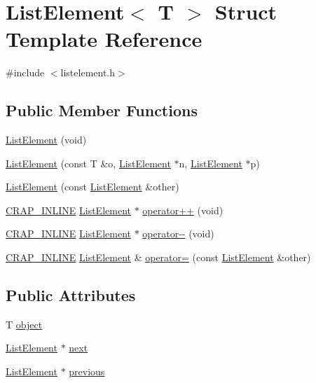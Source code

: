 \hypertarget{struct_list_element}{\section{List\-Element$<$ T $>$ Struct Template Reference}
\label{struct_list_element}
}


{\ttfamily \#include $<$listelement.\-h$>$}

\subsection*{Public Member Functions}
\begin{DoxyCompactItemize}
\item 
\hyperlink{struct_list_element_a61f2c7a2b234ef0737e10493a07c3ca5}{List\-Element} (void)
\item 
\hyperlink{struct_list_element_a82bf6e4fa03b8b37924aa5b9a079272e}{List\-Element} (const T \&o, \hyperlink{struct_list_element}{List\-Element} $\ast$n, \hyperlink{struct_list_element}{List\-Element} $\ast$p)
\item 
\hyperlink{struct_list_element_a2bdd4f435dffcc1f178ea8fd02c91c47}{List\-Element} (const \hyperlink{struct_list_element}{List\-Element} \&other)
\item 
\hyperlink{compilers_8h_a5a40526b8d842e7ff731509998bb0f1c}{C\-R\-A\-P\-\_\-\-I\-N\-L\-I\-N\-E} \hyperlink{struct_list_element}{List\-Element} $\ast$ \hyperlink{struct_list_element_a1afd786d60c33e4b9d4dc960a64a70bc}{operator++} (void)
\item 
\hyperlink{compilers_8h_a5a40526b8d842e7ff731509998bb0f1c}{C\-R\-A\-P\-\_\-\-I\-N\-L\-I\-N\-E} \hyperlink{struct_list_element}{List\-Element} $\ast$ \hyperlink{struct_list_element_a68dfd44ada4d1e91118381643e83f1f2}{operator-\/-\/} (void)
\item 
\hyperlink{compilers_8h_a5a40526b8d842e7ff731509998bb0f1c}{C\-R\-A\-P\-\_\-\-I\-N\-L\-I\-N\-E} \hyperlink{struct_list_element}{List\-Element} \& \hyperlink{struct_list_element_adee597e85e9edb2bbafa7157e5683ef9}{operator=} (const \hyperlink{struct_list_element}{List\-Element} \&other)
\end{DoxyCompactItemize}
\subsection*{Public Attributes}
\begin{DoxyCompactItemize}
\item 
T \hyperlink{struct_list_element_a77e8aab678263bc27d3c3dd45a4bfaf1}{object}
\item 
\hyperlink{struct_list_element}{List\-Element} $\ast$ \hyperlink{struct_list_element_ad3adfca0f9d599149459ad4718d192ee}{next}
\item 
\hyperlink{struct_list_element}{List\-Element} $\ast$ \hyperlink{struct_list_element_af7ce811094ecd21223245853d202d2b8}{previous}
\end{DoxyCompactItemize}


